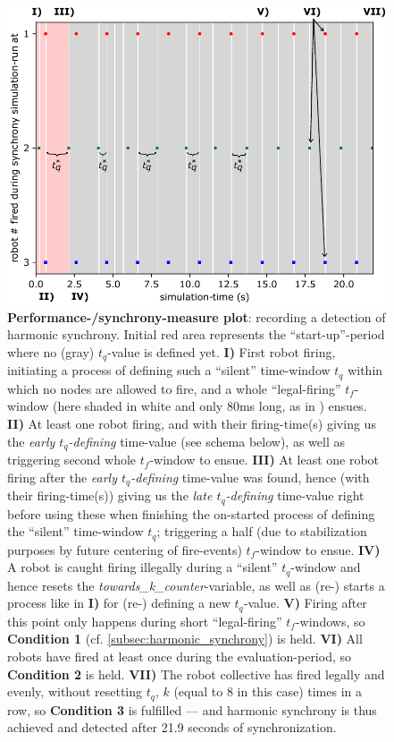 \begin{figure}
	\centering
	\includegraphics[width=\linewidth]{Assets/Figures/Illustrations/ExplanatoryIllustrativePerfMeasurePlot.pdf}
	\caption[A \textbf{performance-measure plot}.]{\textbf{Performance-/synchrony-measure plot}: recording a detection of harmonic synchrony. Initial red area represents the ``start-up''-period where no (gray) $t_q$-value is defined yet. \textbf{I)} First robot firing, initiating a process of defining such a ``silent'' time-window $t_q$ within which no nodes are allowed to fire, and a whole ``legal-firing'' $t_f$-window (here shaded in white and only 80ms long, as in \cite{nymoen_synch}) ensues. \textbf{II)} At least one robot firing, and with their firing-time(s) giving us the \textit{early $t_q$-defining} time-value (see schema below), as well as triggering second whole $t_f$-window to ensue. \textbf{III)} At least one robot firing after the \textit{early $t_q$-defining} time-value was found, hence (with their firing-time(s)) giving us the \textit{late $t_q$-defining} time-value right before using these when finishing the on-started process of defining the ``silent'' time-window $t_q$; triggering a half (due to stabilization purposes by future centering of fire-events) $t_f$-window to ensue. \textbf{IV)} A robot is caught firing illegally during a ``silent'' $t_q$-window and hence resets the \textit{towards\_k\_counter}-variable, as well as (re-) starts a process like in \textbf{I)} for (re-) defining a new $t_q$-value. \textbf{V)} Firing after this point only happens during short ``legal-firing'' $t_f$-windows, so \textbf{Condition 1} (cf. \ref{subsec:harmonic_synchrony}) is held. \textbf{VI)} All robots have fired at least once during the evaluation-period, so \textbf{Condition 2} is held. \textbf{VII)} The robot collective has fired legally and evenly, without resetting $t_q$, $k$ (equal to 8 in this case) times in a row, so \textbf{Condition 3} is fulfilled — and harmonic synchrony is thus achieved and detected after 21.9 seconds of synchronization.}
	\label{fig:perf_measure_plot}
\end{figure}

